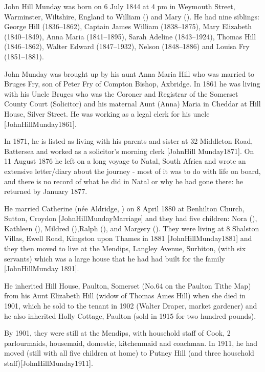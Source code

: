
John Hill Munday was born on 6 July 1844 at 4 pm in Weymouth Street, Warminster, Wiltshire, England\cite{JHMtree, Census1861, JMHbirth} to William () and Mary (). He had nine siblings: George Hill (1836--1862), Captain James William (1838--1875), Mary Elizabeth (1840--1849), Anna Maria (1841--1895), Sarah Adeline (1843--1924), Thomas Hill (1846--1862), Walter Edward (1847--1932), Nelson (1848--1886) and Louisa Fry (1851--1881).

John Munday was brought up by his aunt Anna Maria Hill who was married to Bruges Fry, son of Peter Fry of Compton Bishop, Axbridge. In 1861 he was living with his Uncle Bruges who was the Coroner and Registrar of the Somerset County Court (Solicitor) and his maternal Aunt (Anna) Maria  in Cheddar at  Hill House, Silver Street. He was working as a legal clerk for his uncle [JohnHillMunday1861].

In 1871, he is listed as living with his parents and sister at 32 Middleton Road, Battersea and worked as a 
solicitor's morning clerk [JohnHill Munday1871]. On 11 August 1876 he left on a long voyage to Natal, South Africa and wrote an extensive letter/diary about the journey - most of it was to do with life on board, and there is no record of what he did in Natal or why he had gone there: he returned by January 1877. 

He married Catherine (n\'{e}e Aldridge, ) on 8 April 1880 at Benhilton Church, Sutton, Croydon [JohnHillMundayMarriage] and they had five children: Nora (), Kathleen (), Mildred (),Ralph (), and Margery ().  They were living at 8 Shalston Villas, Ewell Road, Kingston upon Thames in 1881 [JohnHillMunday1881] and they then moved to live at the Mendips, Langley Avenue, Surbiton, (with six servants)  which was  a large house that he had had  built for the family [JohnHillMunday 1891].

He inherited Hill House, Paulton, Somerset (No.64 on the Paulton Tithe Map) from his Aunt Elizabeth Hill (widow of Thomas Ames Hill) when she died in 1901, which he sold to the tenant in 1902 (Walter Draper, market gardener) and he also inherited Holly Cottage, Paulton (sold in 1915 for two hundred pounds).

By 1901, they were still at the Mendips, with household staff of Cook, 2 parlourmaids, housemaid, domestic, kitchenmaid and coachman. In 1911, he had moved (still with all five children at home) to Putney Hill (and three household staff)[JohnHillMunday1911]. 

